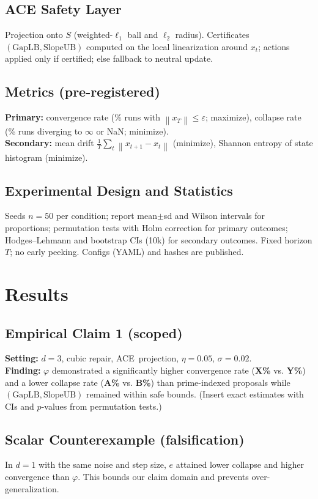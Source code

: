 \documentclass[11pt]{article}
\newcommand{\1}{\mathbf{1}}
\newcommand{\norm}[1]{\left\lVert #1 \right\rVert}
\newcommand{\eps}{\varepsilon}
\newcommand{\gaplb}{\mathrm{GapLB}}
\newcommand{\slopeub}{\mathrm{SlopeUB}}
\newcommand{\phival}{\varphi} %
\newcommand{\ACE}{\textsc{ACE}}
\begin{document}
\subsection{ACE Safety Layer}
Projection onto $S$ (weighted-$\ell_1$ ball and $\ell_2$ radius). Certificates $(\gaplb,\slopeub)$ computed on the local linearization around $x_t$; actions applied only if certified; else fallback to neutral update.

\subsection{Metrics (pre-registered)}
\textbf{Primary:} convergence rate (\% runs with $\norm{x_T}\le\eps$; maximize), collapse rate (\% runs diverging to $\infty$ or NaN; minimize).\\
\textbf{Secondary:} mean drift $\tfrac1T\sum_t \norm{x_{t+1}-x_t}$ (minimize), Shannon entropy of state histogram (minimize).

\subsection{Experimental Design and Statistics}
Seeds $n=50$ per condition; report mean$\pm$sd and Wilson intervals for proportions; permutation tests with Holm correction for primary outcomes; Hodges--Lehmann and bootstrap CIs (10k) for secondary outcomes. Fixed horizon $T$; no early peeking. Configs (YAML) and hashes are published.

\section{Results}
\subsection{Empirical Claim 1 (scoped)}
\textbf{Setting:} $d=3$, cubic repair, \ACE\ projection, $\eta=0.05$, $\sigma=0.02$.\\
\textbf{Finding:} $\phival$ demonstrated a significantly higher convergence rate (\textbf{X\%} vs. \textbf{Y\%}) and a lower collapse rate (\textbf{A\%} vs. \textbf{B\%}) than prime-indexed proposals while $(\gaplb,\slopeub)$ remained within safe bounds. (Insert exact estimates with CIs and $p$-values from permutation tests.)

\subsection{Scalar Counterexample (falsification)}
In $d=1$ with the same noise and step size, $e$ attained lower collapse and higher convergence than $\phival$. This bounds our claim domain and prevents over-generalization.
\end{document}
